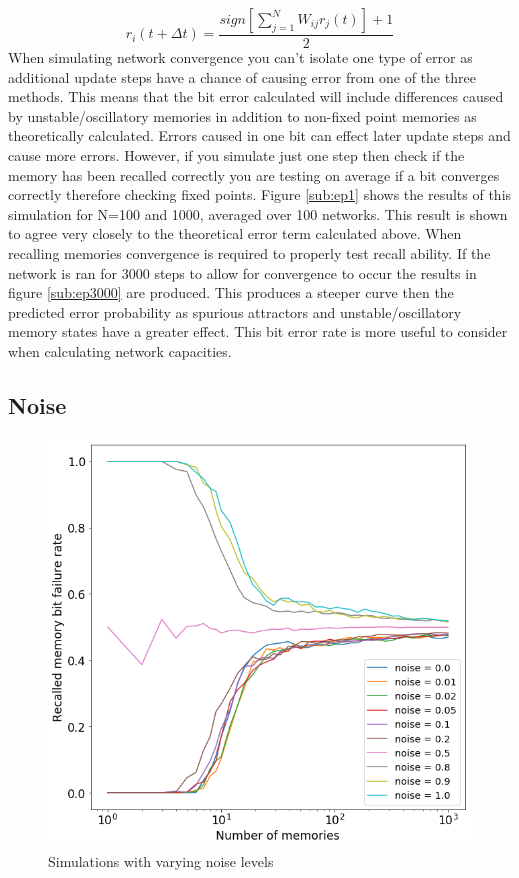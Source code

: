 \documentclass[twoside,twocolumn]{article}
\begin{document}
\begin{equation}
r_i(t+\Delta t)=\frac{sign[\sum\limits_{j=1}^NW_{ij}r_j(t)]+1}{2}
\label{eq:update}
\end{equation}
When simulating network convergence you can't isolate one type of error as additional update steps have a chance of causing error from one of the three methods. This means that the bit error calculated will include differences caused by unstable/oscillatory memories in addition to non-fixed point memories as theoretically calculated. Errors caused in one bit can effect later update steps and cause more errors.
However, if you simulate just one step then check if the memory has been recalled correctly you are testing on average if a bit converges correctly therefore checking fixed points. Figure \ref{sub:ep1} shows the results of this simulation for N=100 and 1000, averaged over 100 networks. This result is shown to agree very closely to the theoretical error term calculated above.
\newline
When recalling memories convergence is required to properly test recall ability.
If the network is ran for 3000 steps to allow for convergence to occur the results in figure \ref{sub:ep3000} are produced. This produces a steeper curve then the predicted error probability as spurious attractors and unstable/oscillatory memory states have a greater effect. This bit error rate is more useful to consider when calculating network capacities.

\subsection{Noise}
\begin{figure}[h]
  \centering
    \includegraphics[width=\linewidth]{noise2}
  \caption{Simulations with varying noise levels}
  \label{fig:noise}
\end{figure}
\end{document}
